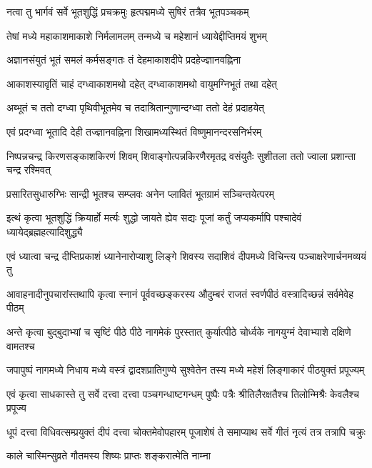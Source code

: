 \twolineshloka
{नत्वा तु भार्गवं सर्वे भूतशुद्धिं प्रचक्रमुः}
{हृत्पद्ममध्ये सुषिरं तत्रैव भूतपञ्चकम्}%

\twolineshloka
{तेषां मध्ये महाकाशमाकाशे निर्मलामलम्}
{तन्मध्ये च महेशानं ध्यायेद्दीप्तिमयं शुभम्}%

\twolineshloka
{अज्ञानसंयुतं भूतं समलं कर्मसङ्गतः}
{तं देहमाकाशदीपे प्रदहेज्ज्ञानवह्निना}%

\twolineshloka
{आकाशस्यावृतिं चाहं दग्ध्वाकाशमथो दहेत्}
{दग्ध्वाकाशमथो वायुमग्निभूतं तथा दहेत्}%

\twolineshloka
{अब्भूतं च ततो दग्ध्वा पृथिवीभूतमेव च}
{तदाश्रितान्गुणान्दग्ध्वा ततो देहं प्रदाहयेत्}%

\twolineshloka
{एवं प्रदग्ध्वा भूतादि देही तज्ज्ञानवह्निना}
{शिखामध्यस्थितं विष्णुमानन्दरसनिर्भरम्}%

\twolineshloka
{निष्पन्नचन्द्र किरणसङ्काशकिरणं शिवम्}
{शिवाङ्गोत्पन्नकिरणैरमृतद्र वसंयुतैः}%
सुशीतला ततो ज्वाला प्रशान्ता चन्द्र रश्मिवत्

\twolineshloka
{प्रसारितसुधारुग्भिः सान्द्री भूतश्च सम्प्लवः}
{अनेन प्लावितं भूतग्रामं सञ्चिन्तयेत्परम्}%

\twolineshloka
{इत्थं कृत्वा भूतशुद्धिं क्रियार्हो मर्त्यः शुद्धो जायते ह्येव सद्यः}
{पूजां कर्तुं जप्यकर्मापि पश्चादेवं ध्यायेद्ब्रह्महत्यादिशुद्ध्यै}%

\twolineshloka
{एवं ध्यात्वा चन्द्र दीप्तिप्रकाशं ध्यानेनारोप्याशु लिङ्गे शिवस्य}
{सदाशिवं दीपमध्ये विचिन्त्य पञ्चाक्षरेणार्चनमव्ययं तु}%

\twolineshloka
{आवाहनादीनुपचारांस्तथापि कृत्वा स्नानं पूर्ववच्छङ्करस्य}
{औदुम्बरं राजतं स्वर्णपीठं वस्त्रादिच्छन्नं सर्वमेवेह पीठम्}%

\twolineshloka
{अन्ते कृत्वा बुद्बुदाभ्यां च सृष्टिं पीठे पीठे नागमेकं पुरस्तात्}
{कुर्यात्पीठे चोर्ध्वके नागयुग्मं देवाभ्याशे दक्षिणे वामतश्च}%

\twolineshloka
{जपापुष्पं नागमध्ये निधाय मध्ये वस्त्रं द्वादशप्रातिगुण्ये}
{सुश्वेतेन तस्य मध्ये महेशं लिङ्गाकारं पीठयुक्तं प्रपूज्यम्}%

\twolineshloka
{एवं कृत्वा साधकास्ते तु सर्वे दत्त्वा दत्त्वा पञ्चगन्धाष्टगन्धम्}
{पुष्पैः पत्रैः श्रीतिलैरक्षतैश्च तिलोन्मिश्रैः केवलैश्च प्रपूज्य}%

\twolineshloka
{धूपं दत्त्वा विधिवत्सम्प्रयुक्तं दीपं दत्त्वा चोक्तमेवोपहारम्}
{पूजाशेषं ते समाप्याथ सर्वे गीतं नृत्यं तत्र तत्रापि चक्रुः}%

\onelineshloka
{काले चास्मिन्सुव्रते गौतमस्य शिष्यः प्राप्तः शङ्करात्मेति नाम्ना}%

